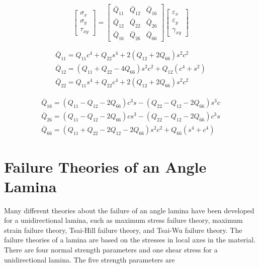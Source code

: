 \documentclass[smallextended]{svjour3}       %
\begin{document}
\begin{equation}
	\left[\begin{array}{l}\sigma_{x} \\ \sigma_{y} \\ \tau_{x
			y}\end{array}\right]=\left[\begin{array}{lll}\bar{Q}_{11} & \bar{Q}_{12} & \bar{Q}_{16}
			\\ \bar{Q}_{12} & \bar{Q}_{22} & \bar{Q}_{26} \\ \bar{Q}_{16} & \bar{Q}_{26} &
			\bar{Q}_{66}\end{array}\right]\left[\begin{array}{l}\varepsilon_{x} \\ \varepsilon_{y}
	\\ \gamma_{x y}\end{array}\right]
\end{equation}

\begin{equation}
	\begin{array}{l}\bar{Q}_{11}=Q_{11} c^{4}+Q_{22} s^{4}+2\left(Q_{12}+2 Q_{66}\right) s^{2} c^{2}
		\\ \bar{Q}_{12}=\left(Q_{11}+Q_{22}-4 Q_{66}\right) s^{2}
		c^{2}+Q_{12}\left(c^{4}+s^{2}\right) \\ \bar{Q}_{22}=Q_{11} s^{4}+Q_{22}
	c^{4}+2\left(Q_{12}+2 Q_{66}\right) s^{2} c^{2}\end{array}
\end{equation}

\begin{equation}
	\begin{array}{l}\bar{Q}_{16}=\left(Q_{11}-Q_{12}-2 Q_{66}\right) c^{3} s-\left(Q_{22}-Q_{12}-2
			Q_{66}\right) s^{3} c \\ \bar{Q}_{26}=\left(Q_{11}-Q_{12}-2 Q_{66}\right) c
			s^{3}-\left(Q_{22}-Q_{12}-2 Q_{66}\right) c^{3} s \\ \bar{Q}_{66}=\left(Q_{11}+Q_{22}-2
		Q_{12}-2 Q_{66}\right) s^{2} c^{2}+Q_{66}\left(s^{4}+c^{4}\right)\end{array}
\end{equation}

\section{Failure Theories of an Angle Lamina}
Many different theories about the failure of an angle lamina have been developed for a
unidirectional lamina, such as maximum stress failure theory, maximum strain failure theory,
Tsai-Hill failure theory, and Tsai-Wu failure theory. The failure theories of a lamina are based on
the stresses in local axes in the material. There are four normal strength parameters and one shear
stress for a unidirectional lamina. The five strength parameters are
\end{document}

